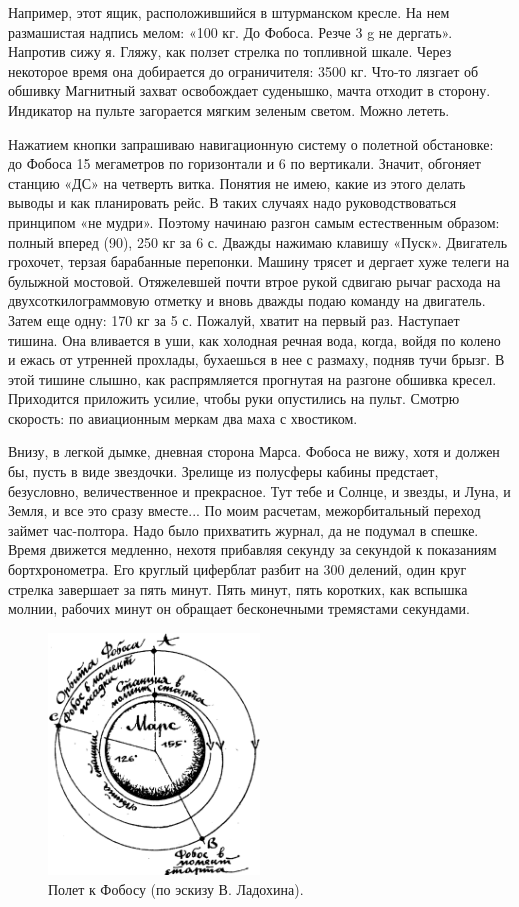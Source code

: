 \documentclass[11pt,a4paper,oneside]{article}
\begin{document}
Например, этот ящик, расположившийся в штурманском кресле. На нем размашистая надпись мелом: «100 кг. До Фобоса. Резче 3 g не дергать». Напротив сижу я. Гляжу, как ползет стрелка по топливной шкале. Через некоторое время она добирается до ограничителя: 3500 кг. Что-то лязгает об обшивку Магнитный захват освобождает суденышко, мачта отходит в сторону. Индикатор на пульте загорается мягким зеленым светом. Можно лететь.

Нажатием кнопки запрашиваю навигационную систему о полетной обстановке: до Фобоса 15 мегаметров по горизонтали и 6 по вертикали. Значит, обгоняет станцию «ДС» на четверть витка. Понятия не имею, какие из этого делать выводы и как планировать рейс. В таких случаях надо руководствоваться принципом «не мудри». Поэтому начинаю разгон самым естественным образом: полный вперед (90\degree), 250 кг за 6 с. Дважды нажимаю клавишу «Пуск». Двигатель грохочет, терзая барабанные перепонки. Машину трясет и дергает хуже телеги на булыжной мостовой. Отяжелевшей почти втрое рукой сдвигаю рычаг расхода на двухсоткилограммовую отметку и вновь дважды подаю команду на двигатель. Затем еще одну: 170 кг за 5 с. Пожалуй, хватит на первый раз. Наступает тишина. Она вливается в уши, как холодная речная вода, когда, войдя по колено и ежась от утренней прохлады, бухаешься в нее с размаху, подняв тучи брызг. В этой тишине слышно, как распрямляется прогнутая на разгоне обшивка кресел. Приходится приложить усилие, чтобы руки опустились на пульт. Смотрю скорость: по авиационным меркам два маха с хвостиком.

Внизу, в легкой дымке, дневная сторона Марса. Фобоса не вижу, хотя и должен бы, пусть в виде звездочки. Зрелище из полусферы кабины предстает, безусловно, величественное и прекрасное. Тут тебе и Солнце, и звезды, и Луна, и Земля, и все это сразу вместе... По моим расчетам, межорбитальный переход займет час-полтора. Надо было прихватить журнал, да не подумал в спешке. Время движется медленно, нехотя прибавляя секунду за секундой к показаниям бортхронометра. Его круглый циферблат разбит на 300 делений, один круг стрелка завершает за пять минут. Пять минут, пять коротких, как вспышка молнии, рабочих минут он обращает бесконечными тремястами секундами.

\begin{figure}[H]
\includegraphics[width=0.5\textwidth]{fobos1}
\caption{Полет к Фобосу (по эскизу В. Ладохина).}
\end{figure}
\end{document}
